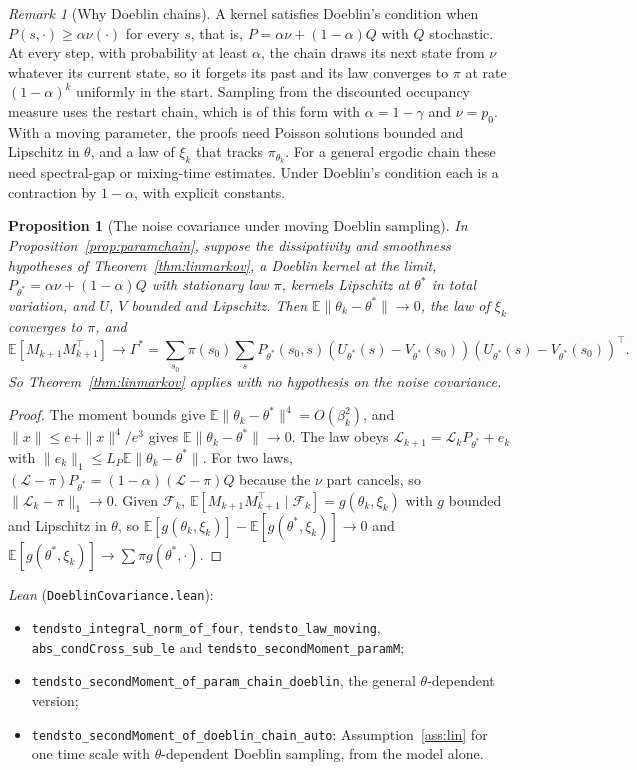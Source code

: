 \documentclass[11pt]{article}
\newtheorem{proposition}[theorem]{Proposition}
\theoremstyle{definition}
\theoremstyle{remark}
\newtheorem{remark}[theorem]{Remark}
\newcommand{\E}{\mathbb{E}}
\begin{document}
\begin{remark}[Why Doeblin chains]
A kernel satisfies Doeblin's condition when $P(s, \cdot) \ge \alpha\nu(\cdot)$ for every $s$, that is,
$P = \alpha\nu + (1-\alpha)Q$ with $Q$ stochastic. At every step, with probability at least $\alpha$, the chain
draws its next state from $\nu$ whatever its current state, so it forgets its past and its law
converges to $\pi$ at rate $(1-\alpha)^k$ uniformly in the start. Sampling from the discounted
occupancy measure uses the restart chain, which is of this form with $\alpha = 1-\gamma$ and $\nu = p_0$.
With a moving parameter, the proofs need Poisson solutions bounded and Lipschitz in $\theta$, and a
law of $\xi_k$ that tracks $\pi_{\theta_k}$. For a general ergodic chain these need spectral-gap or
mixing-time estimates. Under Doeblin's condition each is a contraction by $1-\alpha$, with explicit
constants.
\end{remark}

\begin{proposition}[The noise covariance under moving Doeblin sampling]\label{prop:doeblincov}
In Proposition~\ref{prop:paramchain}, suppose the dissipativity and smoothness hypotheses of
Theorem~\ref{thm:linmarkov}, a Doeblin kernel at the limit, $P_{\theta^*} = \alpha\nu + (1-\alpha)Q$
with stationary law $\pi$, kernels Lipschitz at $\theta^*$ in total variation, and $U$, $V$ bounded and
Lipschitz. Then $\E\|\theta_k - \theta^*\| \to 0$, the law of $\xi_k$ converges to $\pi$, and
\[
  \E[M_{k+1}M_{k+1}^\top] \to \Gamma^* = \sum_{s_0}\pi(s_0)\sum_sP_{\theta^*}(s_0, s)
    (U_{\theta^*}(s) - V_{\theta^*}(s_0))(U_{\theta^*}(s) - V_{\theta^*}(s_0))^\top .
\]
So Theorem~\ref{thm:linmarkov} applies with no hypothesis on the noise covariance.
\end{proposition}
\begin{proof}
The moment bounds give $\E\|\theta_k - \theta^*\|^4 = O(\beta_k^2)$, and $\|x\| \le e + \|x\|^4/e^3$ gives
$\E\|\theta_k - \theta^*\| \to 0$. The law obeys $\mathcal L_{k+1} = \mathcal L_kP_{\theta^*} + e_k$ with
$\|e_k\|_1 \le L_P\E\|\theta_k - \theta^*\|$. For two laws, $(\mathcal L - \pi)P_{\theta^*} =
(1-\alpha)(\mathcal L - \pi)Q$ because the $\nu$ part cancels, so $\|\mathcal L_k - \pi\|_1 \to 0$. Given
$\mathcal F_k$, $\E[M_{k+1}M_{k+1}^\top\mid\mathcal F_k] = g(\theta_k, \xi_k)$ with $g$ bounded and Lipschitz in
$\theta$, so $\E[g(\theta_k, \xi_k)] - \E[g(\theta^*, \xi_k)] \to 0$ and $\E[g(\theta^*, \xi_k)] \to \sum\pi g(\theta^*, \cdot)$.
\end{proof}
\noindent\emph{Lean} (\texttt{DoeblinCovariance.lean}):
\begin{itemize}
\item \texttt{tendsto\_integral\_norm\_of\_four}, \texttt{tendsto\_law\_moving}, \texttt{abs\_condCross\_sub\_le} and
  \texttt{tendsto\_secondMoment\_paramM};
\item \texttt{tendsto\_secondMoment\_of\_param\_chain\_doeblin}, the general $\theta$-dependent version;
\item \texttt{tendsto\_secondMoment\_of\_doeblin\_chain\_auto}: Assumption~\ref{ass:lin} for one time scale with
  $\theta$-dependent Doeblin sampling, from the model alone.
\end{itemize}
\end{document}
